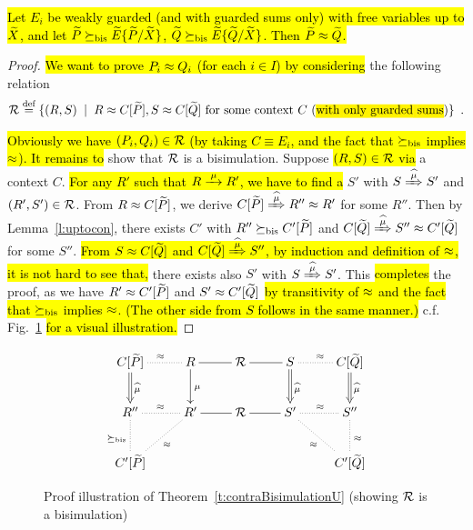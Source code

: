 \begin{theorem}
\label{t:contraBisimulationU} %
\hl{Let $E_i$ be weakly guarded (and with guarded sums only) with free
variables up to $\widetilde X$, and let $\widetilde P \mathrel{\succeq_{\rm{bis}}} \widetilde E\{\widetilde P/\widetilde X\}$,
    $\widetilde Q \mathrel{\succeq_{\rm{bis}}} \widetilde E\{\widetilde Q/\widetilde X\}$. Then $\widetilde P \approx \widetilde Q$.}
\end{theorem}

\begin{proof}
\hl{We want to prove $P_i \approx Q_i$ (for each $i \in I$) by considering} the following relation
\begin{equation*}
\R \DSdefi \{(R,S) \st R \wb \ct{\til P}, S \wb \ct{\til Q} \mbox{~for some context
$\qct$ (\hl{with only guarded sums})} \} \enspace.
\end{equation*}

\hl{Obviously we have $(P_i,Q_i) \in {\cal R}$ (by taking $C \equiv E_i$, and
the fact that $\mathrel{\succeq_{\rm{bis}}}$ implies $\approx$). It remains to}
show that ${\cal R}$ is a bisimulation. Suppose \hl{$(R, S) \in {\cal R}$ via} a context
$C$. \hl{For any $R'$ such that $R \arr{\mu} R'$, we have to find a} $S'$ with $S \Arcap{\mu}
S'$ and $(R', S') \in {\cal R}$. From $R \approx C[{\widetilde P}]$, we derive $C[{\til P}]
\Arcap{\mu} R'' \wb R'$ for some $R''$. Then by Lemma~\ref{l:uptocon},
there exists $C'$ with $R'' \mathrel{\succeq_{\rm{bis}}} C'[{\widetilde P}]$ and $C[{\til Q}]
\Arcap{\mu} S'' \wb C'[{\til Q}]$ for some $S''$. \hl{From $S \approx C[{\widetilde
  Q}]$ and $C[{\til Q}] \Arcap{\mu} S''$, by induction and definition of $\approx$, it is not
hard to see that,}
there exists also $S'$ with $S \Arcap{\mu} S'$. This \hl{completes} the
proof, as we have $R' \approx C'[{\widetilde P}]$ and $S' \approx C'[{\widetilde Q}]$ \hl{by
transitivity of $\approx$ and the fact that $\mathrel{\succeq_{\rm{bis}}}$ implies $\approx$.
(The other side from $S$ follows in the same manner.)}
c.f. Fig.~\ref{fig:310} \hl{for a visual illustration.}
\end{proof}

\begin{figure}[ht]
\begin{displaymath}
  \xymatrix{
    {C[{\til P}]} \ar@{.}[r]^{\wb} \ar@{=>}[d]^{\widehat{\mu}} & {R} \ar@{-}[r]
    \ar@{->}[d]^{\mu} & {\R} \ar@{-}[r] & {S} \ar@{.}[r]^{\wb}
    \ar@{=>}[d]^{\widehat{\mu}} & {C[{\til Q}]} \ar@{=>}[d]^{\widehat{\mu}} \\
    {R''} \ar@{.}[d]_{\mcontrBIS} \ar@{.}[r]^{\wb} & {R'} \ar@{-}[r]
    \ar@{.}[ld]^{\wb} & {\R} \ar@{-}[r] & {S'} \ar@{.}[r]^{\wb} \ar@{.}[rd]_{\wb}
    & {S''} \ar@{.}[d]^{\wb} \\
    {C'[{\til P}]} & {} & {} & {} & {C'[{\til Q}]}
  }
\end{displaymath}
\caption{Proof illustration of Theorem~\ref{t:contraBisimulationU}
  (showing ${\cal R}$ is a bisimulation)}
\label{fig:310}
\end{figure}

